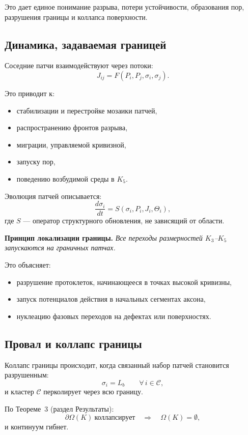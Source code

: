 Это дает единое понимание разрыва, потери устойчивости, образования пор,
разрушения границы и коллапса поверхности.

\subsection{Динамика, задаваемая границей}

Соседние патчи взаимодействуют через потоки:
\[
  J_{ij} = F(P_i, P_j, \sigma_i, \sigma_j).
\]

Это приводит к:
\begin{itemize}
    \item стабилизации и перестройке мозаики патчей,
    \item распространению фронтов разрыва,
    \item миграции, управляемой кривизной,
    \item запуску пор,
    \item поведению возбудимой среды в \(K_5\).
\end{itemize}

Эволюция патчей описывается:
\[
  \frac{d\sigma_i}{dt}
  = S(\sigma_i, P_i, J_i, \Theta_i),
\]
где \(S\) — оператор структурного обновления, не зависящий от области.

\medskip
\textbf{Принцип локализации границы.}
\emph{Все переходы размерностей \(K_3\)--\(K_5\) запускаются на граничных патчах.}

Это объясняет:
\begin{itemize}
    \item разрушение протоклеток, начинающееся в точках высокой кривизны,
    \item запуск потенциалов действия в начальных сегментах аксона,
    \item нуклеацию фазовых переходов на дефектах или поверхностях.
\end{itemize}

\subsection{Провал и коллапс границы}

Коллапс границы происходит, когда связанный набор патчей становится разрушенным:
\[
  \sigma_i = L_b
  \qquad \forall\, i \in \mathcal{C},
\]
и кластер \(\mathcal{C}\) перколирует через всю границу.

По Теореме~3 (раздел Результаты):
\[
  \partial\Omega(K)\ \text{коллапсирует}
  \quad\Longrightarrow\quad
  \Omega(K) = \emptyset,
\]
и континуум гибнет.

